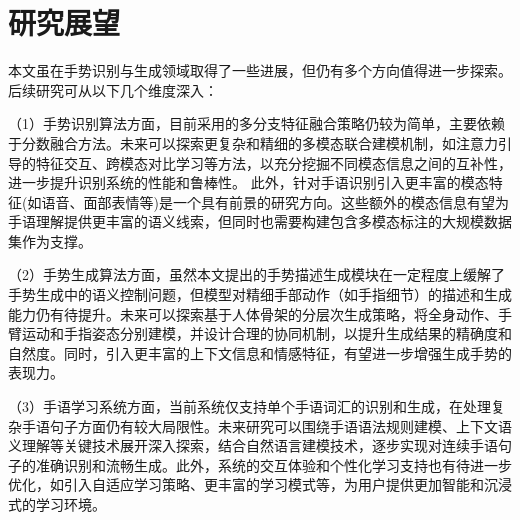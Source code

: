 \section{研究展望}
本文虽在手势识别与生成领域取得了一些进展，但仍有多个方向值得进一步探索。后续研究可从以下几个维度深入：

（1）手势识别算法方面，目前采用的多分支特征融合策略仍较为简单，主要依赖于分数融合方法。未来可以探索更复杂和精细的多模态联合建模机制，如注意力引导的特征交互、跨模态对比学习等方法，以充分挖掘不同模态信息之间的互补性，进一步提升识别系统的性能和鲁棒性。
此外，针对手语识别引入更丰富的模态特征(如语音、面部表情等)是一个具有前景的研究方向。这些额外的模态信息有望为手语理解提供更丰富的语义线索，但同时也需要构建包含多模态标注的大规模数据集作为支撑。

（2）手势生成算法方面，虽然本文提出的手势描述生成模块在一定程度上缓解了手势生成中的语义控制问题，但模型对精细手部动作（如手指细节）的描述和生成能力仍有待提升。未来可以探索基于人体骨架的分层次生成策略，将全身动作、手臂运动和手指姿态分别建模，并设计合理的协同机制，以提升生成结果的精确度和自然度。同时，引入更丰富的上下文信息和情感特征，有望进一步增强生成手势的表现力。

（3）手语学习系统方面，当前系统仅支持单个手语词汇的识别和生成，在处理复杂手语句子方面仍有较大局限性。未来研究可以围绕手语语法规则建模、上下文语义理解等关键技术展开深入探索，结合自然语言建模技术，逐步实现对连续手语句子的准确识别和流畅生成。此外，系统的交互体验和个性化学习支持也有待进一步优化，如引入自适应学习策略、更丰富的学习模式等，为用户提供更加智能和沉浸式的学习环境。